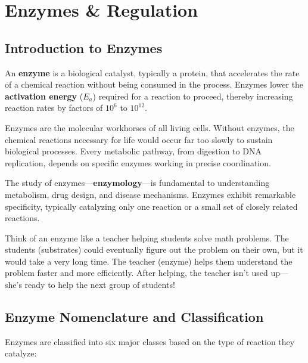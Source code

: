 \section{Enzymes \& Regulation}

\subsection{Introduction to Enzymes}

\begin{definition}
An \textbf{enzyme} is a biological catalyst, typically a protein, that accelerates the rate of a chemical reaction without being consumed in the process. Enzymes lower the \textbf{activation energy} ($E_a$) required for a reaction to proceed, thereby increasing reaction rates by factors of $10^6$ to $10^{12}$.
\end{definition}

Enzymes are the molecular workhorses of all living cells. Without enzymes, the chemical reactions necessary for life would occur far too slowly to sustain biological processes. Every metabolic pathway, from digestion to DNA replication, depends on specific enzymes working in precise coordination.

The study of enzymes---\textbf{enzymology}---is fundamental to understanding metabolism, drug design, and disease mechanisms. Enzymes exhibit remarkable specificity, typically catalyzing only one reaction or a small set of closely related reactions.

\begin{analogy}
Think of an enzyme like a teacher helping students solve math problems. The students (substrates) could eventually figure out the problem on their own, but it would take a very long time. The teacher (enzyme) helps them understand the problem faster and more efficiently. After helping, the teacher isn't used up---she's ready to help the next group of students!
\end{analogy}

\subsection{Enzyme Nomenclature and Classification}

Enzymes are classified into six major classes based on the type of reaction they catalyze:

